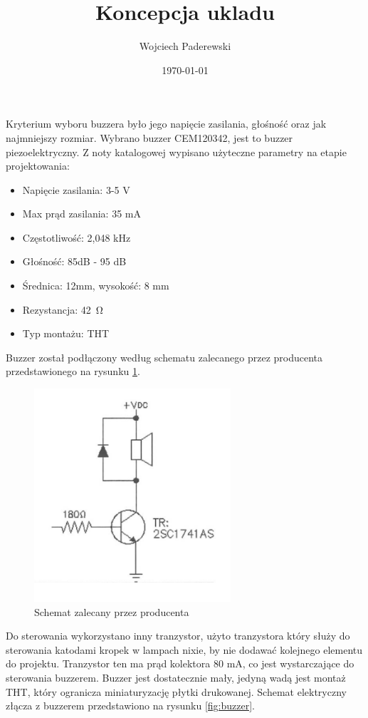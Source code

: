 \documentclass[../../main.tex]{subfiles}
\author{Wojciech Paderewski}
\date{\today}
\title{Koncepcja ukladu}
\begin{document}
Kryterium wyboru buzzera było jego napięcie zasilania, głośność oraz jak najmniejszy rozmiar.
Wybrano buzzer CEM120342, jest to buzzer piezoelektryczny. Z noty katalogowej \cite{st:buzzer} wypisano użyteczne parametry na etapie projektowania:

\begin{itemize}
    \item Napięcie zasilania: 3-5 V
    \item Max prąd zasilania: 35 mA
    \item Częstotliwość: 2,048 kHz
    \item Głośność: 85dB - 95 dB
    \item Średnica: 12mm, wysokość: 8 mm
    \item Rezystancja: \SI{42}{\ohm}
    \item Typ montażu: THT
\end{itemize}

Buzzer został podłączony według schematu zalecanego przez producenta przedstawionego na rysunku \ref{fig:buzzer_karta}.
\begin{figure}[H]
    \centering
    \includegraphics[width=0.65\textwidth]{buzzer_karta.png}
    \caption{Schemat zalecany przez producenta \cite{st:buzzer}}
    \label{fig:buzzer_karta}
\end{figure}

Do sterowania wykorzystano inny tranzystor,
użyto tranzystora który służy do sterowania katodami kropek w lampach nixie, by nie dodawać kolejnego elementu do projektu.
Tranzystor ten ma prąd kolektora 80 mA, co jest wystarczające do sterowania buzzerem.
Buzzer jest dostatecznie mały, jedyną wadą jest montaż THT, który ogranicza miniaturyzację płytki drukowanej.
Schemat elektryczny złącza z buzzerem przedstawiono na rysunku \ref{fig:buzzer}.
\end{document}

